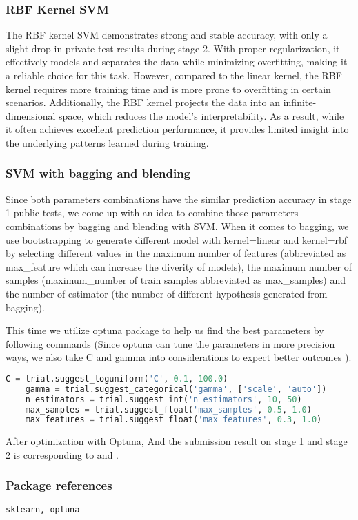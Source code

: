 \subsubsection*{RBF Kernel SVM}
\quad The RBF kernel SVM demonstrates strong and stable accuracy, 
with only a slight drop in private test results during stage 2. 
With proper regularization, it effectively models and separates the data while minimizing overfitting, 
making it a reliable choice for this task. However, compared to the linear kernel, 
the RBF kernel requires more training time and is more prone to overfitting in certain scenarios. 
Additionally, the RBF kernel projects the data into an infinite-dimensional space, 
which reduces the model's interpretability. As a result, while it often achieves excellent prediction performance, 
it provides limited insight into the underlying patterns learned during training.



\subsubsection*{SVM with bagging and blending}

\quad Since both parameters combinations have the similar prediction accuracy in stage 1 public tests, we come up with an idea to combine those parameters combinations by 
bagging and blending with SVM. When it comes to bagging, we use bootstrapping to generate different model  
with kernel=linear and kernel=rbf by selecting different values in the maximum number of features 
(abbreviated as max\_feature which can increase the diverity of models), the maximum number of samples (maximum\_number of train samples 
abbreviated as max\_samples) and the number of estimator (the number of different hypothesis generated from bagging).

This time we utilize optuna package to help us find the best parameters by following commands 
(Since optuna can tune the parameters in more precision ways, we also take C and gamma into considerations to expect better outcomes ).
\begin{lstlisting}[language=Python]
    C = trial.suggest_loguniform('C', 0.1, 100.0)
    gamma = trial.suggest_categorical('gamma', ['scale', 'auto'])
    n_estimators = trial.suggest_int('n_estimators', 10, 50)
    max_samples = trial.suggest_float('max_samples', 0.5, 1.0)
    max_features = trial.suggest_float('max_features', 0.3, 1.0)
\end{lstlisting}
\quad After optimization with Optuna, 
And the submission result on stage 1 and stage 2 is corresponding to and .

\subsubsection*{Package references}
\begin{lstlisting}[language=Python]
sklearn, optuna
\end{lstlisting}